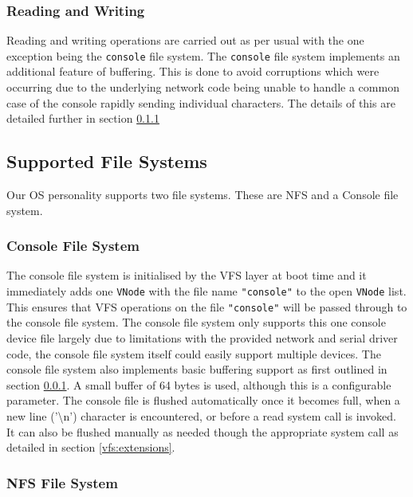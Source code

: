 \documentclass[12pt,english]{article}
\begin{document}
\subsubsection{Reading and Writing} \label{vfs:read_write}

Reading and writing operations are carried out as per usual with the one exception being the \texttt{console} file system. The \texttt{console} file system implements an additional feature of buffering. This is done to avoid corruptions which were occurring due to the underlying network code being unable to handle a common case of the console rapidly sending individual characters. The details of this are detailed further in section \ref{vfs:console}

\subsection{Supported File Systems} \label{vfs:filesystems}

Our OS personality supports two file systems. These are NFS and a Console file system.

\subsubsection{Console File System} \label{vfs:console}

The console file system is initialised by the VFS layer at boot time and it immediately adds one \texttt{VNode} with the file name \texttt{"console"} to the open \texttt{VNode} list. This ensures that VFS operations on the file \texttt{"console"} will be passed through to the console file system. The console file system only supports this one console device file largely due to limitations with the provided network and serial driver code, the console file system itself could easily support multiple devices. The console file system also implements basic buffering support as first outlined in section \ref{vfs:read_write}. A small buffer of 64 bytes is used, although this is a configurable parameter. The console file is flushed automatically once it becomes full, when a new line ('\textbackslash n') character is encountered, or before a read system call is invoked. It can also be flushed manually as needed though the appropriate system call as detailed in section \ref{vfs:extensions}.

\subsubsection{NFS File System} \label{vfs:nfs}
\end{document}
